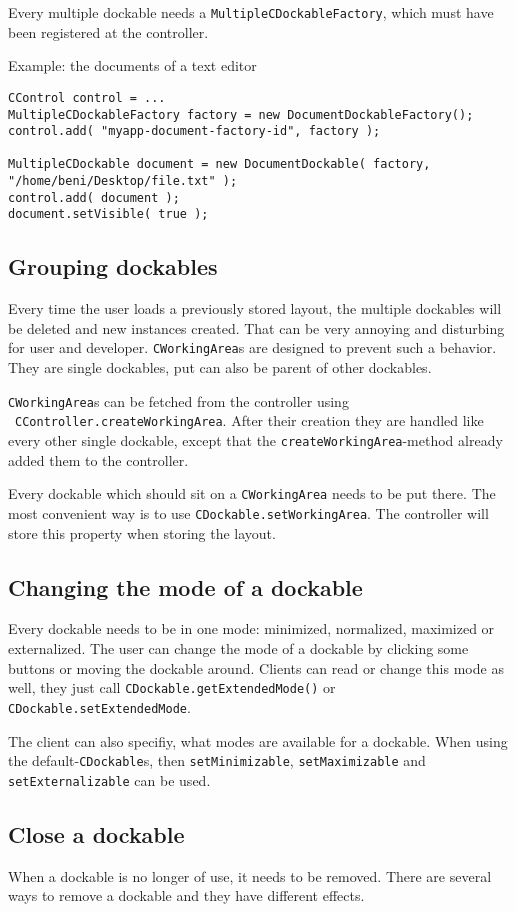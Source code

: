\documentclass[a4paper,10pt]{article}
\newcommand{\src}[1]{\lstinline[basicstyle=\ttfamily]|#1|}
\begin{document}
Every multiple dockable needs a \src{MultipleCDockableFactory}, which must have been registered at the controller.

Example: the documents of a text editor
\begin{lstlisting}
CControl control = ...
MultipleCDockableFactory factory = new DocumentDockableFactory();
control.add( "myapp-document-factory-id", factory );

MultipleCDockable document = new DocumentDockable( factory, "/home/beni/Desktop/file.txt" );
control.add( document );
document.setVisible( true );
\end{lstlisting}

\subsection{Grouping dockables}
Every time the user loads a previously stored layout, the multiple dockables will be deleted and new instances created. That can be very annoying and disturbing for user and developer. \src{CWorkingArea}s are designed to prevent such a behavior. They are single dockables, put can also be parent of other dockables.

\src{CWorkingArea}s can be fetched from the controller using \ \src{CController.createWorkingArea}. After their creation they are handled like every other single dockable, except that the \src{createWorkingArea}-method already added them to the controller.

Every dockable which should sit on a \src{CWorkingArea} needs to be put there. The most convenient way is to use \src{CDockable.setWorkingArea}. The controller will store this property when storing the layout.

\subsection{Changing the mode of a dockable}
Every dockable needs to be in one mode: minimized, normalized, maximized or externalized. The user can change the mode of a dockable by clicking some buttons or moving the dockable around. Clients can read or change this mode as well, they just call \src{CDockable.getExtendedMode()} or \src{CDockable.setExtendedMode}.

The client can also specifiy, what modes are available for a dockable. When using the default-\src{CDockable}s, then \src{setMinimizable}, \src{setMaximizable} and \src{setExternalizable} can be used.

\subsection{Close a dockable}
When a dockable is no longer of use, it needs to be removed. There are several ways to remove a dockable and they have different effects.
\end{document}
